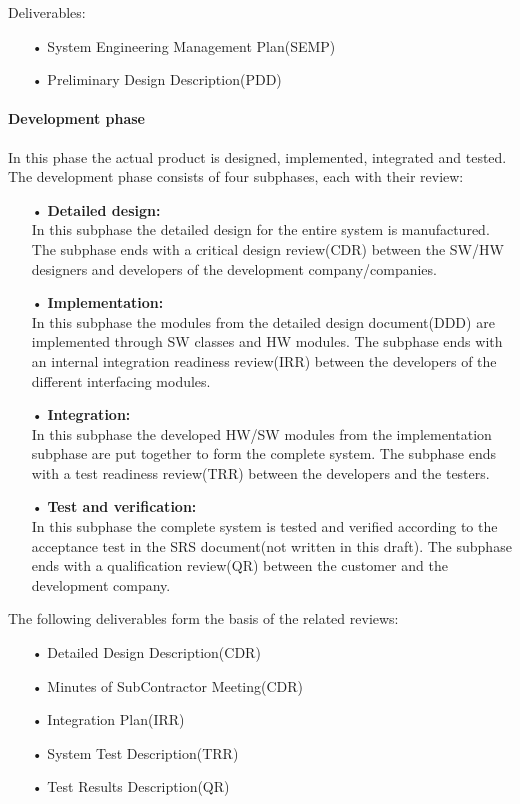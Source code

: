 Deliverables:
\begin{enumerate}
\item[•] System Engineering Management Plan(SEMP)
\item[•] Preliminary Design Description(PDD)
\end{enumerate}


\paragraph{Development phase}
In this phase the actual product is designed, implemented, integrated and tested. The development phase consists of four subphases, each with their review: 
\begin{enumerate}
\item[•] \textbf{Detailed design:} \\
In this subphase the detailed design for the entire system is manufactured. The subphase ends with a critical design review(CDR) between the SW/HW designers and developers of the development company/companies.

\item[•] \textbf{Implementation:}\\
In this subphase the modules from the detailed design document(DDD) are implemented through SW classes and HW modules. The subphase ends with an internal integration readiness review(IRR) between the developers of the different interfacing modules.

\item[•] \textbf{Integration:}\\
In this subphase the developed HW/SW modules from the implementation subphase are put together to form the complete system. The subphase ends with a test readiness review(TRR) between the developers and the testers.

\item[•] \textbf{Test and verification:}\\
In this subphase the complete system is tested and verified according to the acceptance test in the SRS document(not written in this draft). The subphase ends with a qualification review(QR) between the customer and the development company. 
\end{enumerate}

The following deliverables form the basis of the related reviews:
\begin{enumerate}
\item[•] Detailed Design Description(CDR)
\item[•] Minutes of SubContractor Meeting(CDR)
\item[•] Integration Plan(IRR)
\item[•] System Test Description(TRR)
\item[•] Test Results Description(QR)
\end{enumerate}


